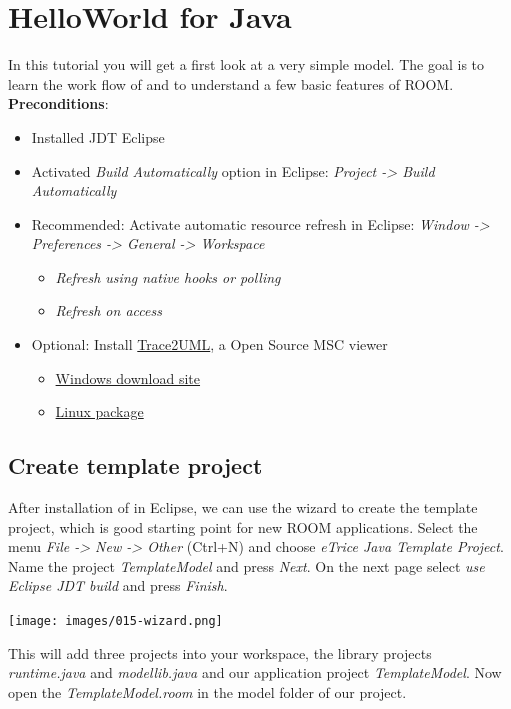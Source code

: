 \section{HelloWorld for Java}

In this tutorial you will get a first look at a very simple \eTrice{} model. The goal is to learn the work flow of \eTrice{} and to understand a few basic features of ROOM.
\textbf{Preconditions}:
\begin{itemize}
	\item Installed JDT Eclipse
	\item Activated \emph{Build Automatically} option in Eclipse: \emph{Project -> Build Automatically}
	\item Recommended: Activate automatic resource refresh in Eclipse: \emph{Window -> Preferences -> General -> Workspace}
	\begin{itemize}
		\item \emph{Refresh using native hooks or polling}
		\item \emph{Refresh on access}
	\end{itemize}
	\item Optional: Install \href{http://trace2uml.stage.tigris.org/}{Trace2UML}, a Open Source MSC viewer
	\begin{itemize}
		\item \href{http://trace2uml.tigris.org/servlets/ProjectDocumentList?folderID=6208}{Windows download site}
		\item \href{http://apt.astade.de/}{Linux package}
	\end{itemize}
	
\end{itemize}

\subsection{Create template project}
After installation of \eTrice in Eclipse, we can use the wizard to create the template project, which is good starting point for new ROOM applications. Select the menu \emph{File -> New -> Other} (Ctrl+N) and choose \emph{eTrice Java Template Project}. Name the project \emph{TemplateModel} and press \emph{Next}. On the next page select \emph{use Eclipse JDT build} and press \emph{Finish}.

\texttt{[image: images/015-wizard.png]}

This will add three projects into your workspace, the library projects \emph{runtime.java} and \emph{modellib.java} and our application project \emph{TemplateModel}. Now open the \emph{TemplateModel.room} in the model folder of our project.

